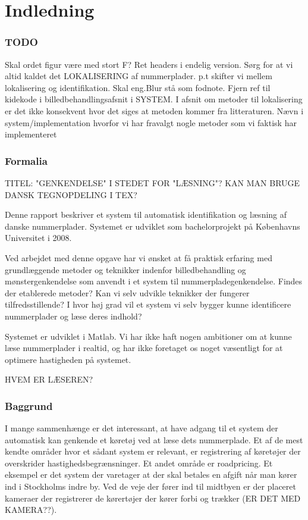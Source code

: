 \section{Indledning}

\subsubsection*{TODO}
Skal ordet figur være med stort F?
Ret headers i endelig version.
Sørg for at vi altid kaldet det LOKALISERING af nummerplader. p.t skifter vi mellem lokalisering og identifikation.
Skal eng.Blur stå som fodnote.
Fjern ref til kidekode i billedbehandlingsafsnit i SYSTEM.
I afsnit om metoder til lokalisering er det ikke konsekvent hvor det siges at metoden kommer fra litteraturen.
Nævn i system/implementation hvorfor vi har fravalgt nogle metoder som vi faktisk har implementeret

\subsubsection*{Formalia}

TITEL: "GENKENDELSE" I STEDET FOR "LÆSNING"?
KAN MAN BRUGE DANSK TEGNOPDELING I TEX?

Denne rapport beskriver et system til automatisk identifikation og læsning af danske nummerplader. Systemet er udviklet som bachelorprojekt på Københavns Universitet i 2008.

Ved arbejdet med denne opgave har vi ønsket at få praktisk erfaring med grundlæggende metoder og teknikker indenfor billedbehandling og mønstergenkendelse som anvendt i et system til nummerpladegenkendelse. Findes der etablerede metoder? Kan vi selv udvikle teknikker der fungerer tilfredsstillende? I hvor høj grad vil et system vi selv bygger kunne identificere nummerplader og læse deres indhold?

Systemet er udviklet i Matlab. Vi har ikke haft nogen ambitioner om at kunne læse nummerplader i realtid, og har ikke foretaget os noget væsentligt for at optimere hastigheden på systemet.

HVEM ER LÆSEREN?

\subsubsection*{Baggrund}
I mange sammenhænge er det interessant, at have adgang til et system der automatisk kan genkende et køretøj ved at læse dets nummerplade. Et af de mest kendte områder hvor et sådant system er relevant, er registrering af køretøjer der overskrider hastighedsbegrænsninger. Et andet område er roadpricing. Et eksempel er det system der varetager at der skal betales en afgift når man kører ind i Stockholms indre by. Ved de veje der fører ind til midtbyen er der placeret kameraer der registrerer de kørertøjer der kører forbi og trækker (ER DET MED KAMERA??).

